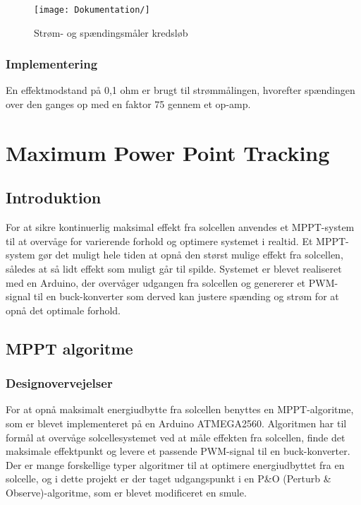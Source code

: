\documentclass[../main.tex]{subfiles}
\begin{document}
        \begin{figure}[H]
        \texttt{[image: Dokumentation/]}
        \caption{Strøm- og spændingsmåler kredsløb}
        \label{fig: Strøm- og spændingsmåler kredsløb}
        \end{figure}
            
        \subsubsection{Implementering}

        En effektmodstand på 0,1 ohm er brugt til strømmålingen, hvorefter spændingen over den ganges op med en faktor 75 gennem et op-amp.

\section{Maximum Power Point Tracking}

    \subsection{Introduktion}

    For at sikre kontinuerlig maksimal effekt fra solcellen anvendes et MPPT-system til at overvåge for varierende forhold og optimere systemet i realtid. Et MPPT-system gør det muligt hele tiden at opnå den størst mulige effekt fra solcellen, således at så lidt effekt som muligt går til spilde. Systemet er blevet realiseret med en Arduino, der overvåger udgangen fra solcellen og genererer et PWM-signal til en buck-konverter som derved kan justere spænding og strøm for at opnå det optimale forhold. 

    \subsection{MPPT algoritme}

    \subsubsection{Designovervejelser}

    For at opnå maksimalt energiudbytte fra solcellen benyttes en MPPT-algoritme, som er blevet implementeret på en Arduino ATMEGA2560. Algoritmen har til formål at overvåge solcellesystemet ved at måle effekten fra solcellen, finde det maksimale effektpunkt og levere et passende PWM-signal til en buck-konverter. Der er mange forskellige typer algoritmer til at optimere energiudbyttet fra en solcelle, og i dette projekt er der taget udgangspunkt i en P&O (Perturb & Observe)-algoritme, som er blevet modificeret en smule.
\end{document}
